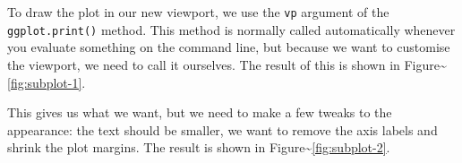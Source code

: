 To draw the plot in our new viewport, we use the \texttt{vp} argument of
the \texttt{ggplot.print()} method. This method is normally called
automatically whenever you evaluate something on the command line, but
because we want to customise the viewport, we need to call it ourselves.
The result of this is shown in
Figure\textasciitilde{}\ref{fig:subplot-1}.

\begin{Shaded}
\begin{Highlighting}[]
\NormalTok{(}\NormalTok{, } \NormalTok{, } \NormalTok{)}
\StringTok{ }\NormalTok{(} \NormalTok{, } \NormalTok{, } \NormalTok{, } \NormalTok{)}
 
\NormalTok{()}
\end{Highlighting}
\end{Shaded}

This gives us what we want, but we need to make a few tweaks to the
appearance: the text should be smaller, we want to remove the axis
labels and shrink the plot margins. The result is shown in
Figure\textasciitilde{}\ref{fig:subplot-2}.

\begin{Shaded}
\begin{Highlighting}[]
\StringTok{ }\StringTok{ }
\StringTok{  }\NormalTok{(}\NormalTok{) +}\StringTok{ }
\StringTok{  }\NormalTok{(} \NormalTok{, } \NormalTok{) +}\StringTok{ }
\StringTok{  }\NormalTok{(} \NormalTok{(}\NormalTok{(}\NormalTok{, }\NormalTok{), }\NormalTok{))}

\NormalTok{(}\NormalTok{, } \NormalTok{, } \NormalTok{)}
 
\NormalTok{()}
\end{Highlighting}
\end{Shaded}

